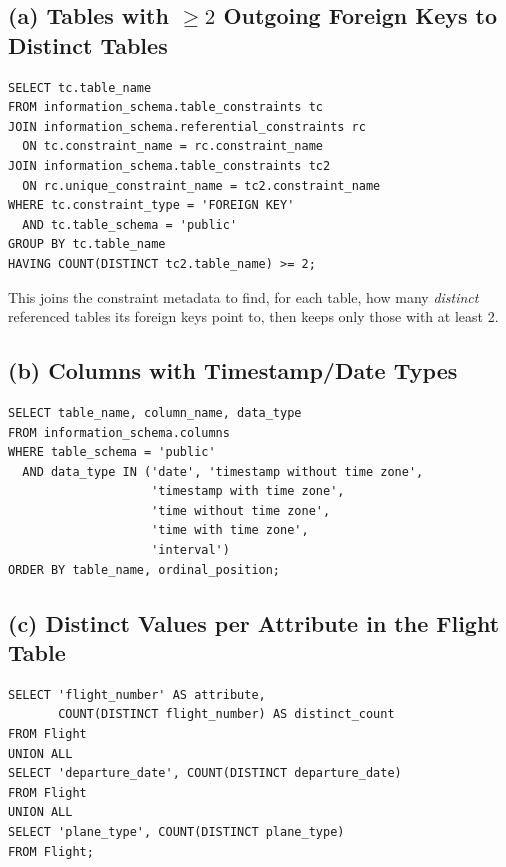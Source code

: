 \documentclass[11pt]{article}
\begin{document}
\subsection{(a) Tables with $\geq 2$ Outgoing Foreign Keys to Distinct Tables}

\begin{lstlisting}
SELECT tc.table_name
FROM information_schema.table_constraints tc
JOIN information_schema.referential_constraints rc
  ON tc.constraint_name = rc.constraint_name
JOIN information_schema.table_constraints tc2
  ON rc.unique_constraint_name = tc2.constraint_name
WHERE tc.constraint_type = 'FOREIGN KEY'
  AND tc.table_schema = 'public'
GROUP BY tc.table_name
HAVING COUNT(DISTINCT tc2.table_name) >= 2;
\end{lstlisting}

This joins the constraint metadata to find, for each table, how many \textit{distinct} referenced tables its foreign keys point to, then keeps only those with at least 2.

\subsection{(b) Columns with Timestamp/Date Types}

\begin{lstlisting}
SELECT table_name, column_name, data_type
FROM information_schema.columns
WHERE table_schema = 'public'
  AND data_type IN ('date', 'timestamp without time zone',
                    'timestamp with time zone',
                    'time without time zone',
                    'time with time zone',
                    'interval')
ORDER BY table_name, ordinal_position;
\end{lstlisting}

\subsection{(c) Distinct Values per Attribute in the Flight Table}

\begin{lstlisting}
SELECT 'flight_number' AS attribute,
       COUNT(DISTINCT flight_number) AS distinct_count
FROM Flight
UNION ALL
SELECT 'departure_date', COUNT(DISTINCT departure_date)
FROM Flight
UNION ALL
SELECT 'plane_type', COUNT(DISTINCT plane_type)
FROM Flight;
\end{lstlisting}
\end{document}
